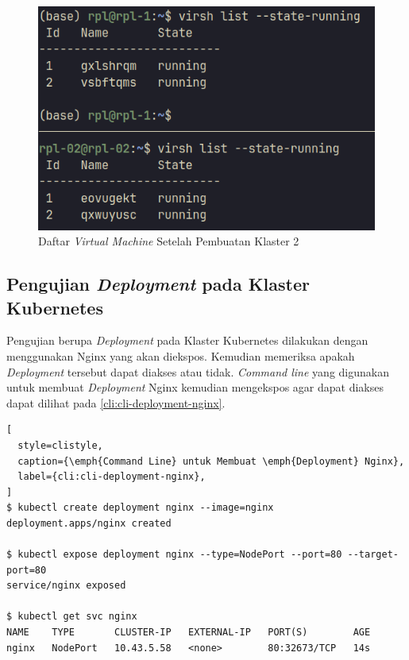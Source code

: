 \begin{figure}[H]
  \centering
  \includegraphics[scale=0.3]{gambar/ssh-nodes-list-2.png}
  \caption{Daftar \emph{Virtual Machine} Setelah Pembuatan Klaster 2}
  \label{fig:vm-komputer-fisik-2}
\end{figure}

\subsection{Pengujian \emph{Deployment} pada Klaster Kubernetes}
\label{subsec:pengujian-deployment}

Pengujian berupa \emph{Deployment} pada Klaster Kubernetes dilakukan dengan
menggunakan Nginx yang akan diekspos. Kemudian memeriksa apakah \emph{Deployment}
tersebut dapat diakses atau tidak. \emph{Command line} yang digunakan untuk
membuat \emph{Deployment} Nginx kemudian mengekspos agar dapat diakses
dapat dilihat pada \ref{cli:cli-deployment-nginx}.

{\renewcommand{\lstlistingname}{Instruksi Terminal}
\begin{lstlisting}[
  style=clistyle,
  caption={\emph{Command Line} untuk Membuat \emph{Deployment} Nginx},
  label={cli:cli-deployment-nginx},
]
$ kubectl create deployment nginx --image=nginx
deployment.apps/nginx created

$ kubectl expose deployment nginx --type=NodePort --port=80 --target-port=80
service/nginx exposed

$ kubectl get svc nginx
NAME    TYPE       CLUSTER-IP   EXTERNAL-IP   PORT(S)        AGE
nginx   NodePort   10.43.5.58   <none>        80:32673/TCP   14s
\end{lstlisting}
}

